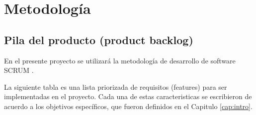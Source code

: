 \chapter{Metodolog\'ia}

\section{Pila del producto (product backlog)}
En el presente proyecto se utilizará la metodología de desarrollo de software SCRUM \cite{scrum_book}.

La siguiente tabla es una lista priorizada de requisitos (features) para ser implementadas en el proyecto. Cada una de estas caracteristicas se escribieron de acuerdo a los objetivos específicos, que fueron definidos en el Capitulo \ref{cap:intro}.

\def\arraystretch{2}
\newcommand{\pbesquiv}{Como robot debo ser capaz de esquivar los obstáculos que se presentan en el camino del robot, con el objetivo de hacerlo de forma autónoma. }

\newcommand{\pbplathard}{Como estudiante debo implementar una plataforma de hardware que sirva de base para el robot, con el objetivo de tener un robot operativo.}
\newcommand{\pbrecon}{Como robot quiero ser capaz de reconocer objetos existentes en un fotograma, con el objetivo de tener estos datos para calcular su posición en el plano.}

\newcommand{\pbprof}{Como robot quiero saber a que profundidad en el plano se encuentran los obstáculos, con el objetivo de poder esquivarlos sabiendo su posición.}

\newcommand{\pbdocum}{Como estudiante debo escribir la documentación del proyecto de grado, con el objetivo de tenerlo completado.}

\newcommand{\pbincli}{Como robot quiero saber mi inclinación actual, con el objetivo de saber si estoy en peligro de volcarme.}

